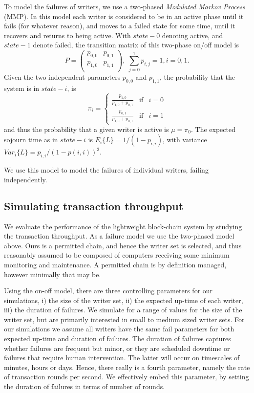 \documentclass[10pt]{article}
\begin{document}
To model the failures of writers, we use a two-phased \emph{Modulated Markov Process} (MMP). In this model each writer is considered to be in an active phase until it fails (for whatever reason), and moves to a failed state for some time, until it recovers and returns to being active. With $state-0$ denoting active, and $state-1$ denote failed, the transition matrix of this two-phase on/off model is
\[
P = 
\begin{pmatrix}
    p_{0,0} & p_{0,1} \\
    p_{1,0} & p_{1,1} \\
\end{pmatrix}
 , \;
\sum_{j=0}^{1} p_{i,j} = 1, i = 0,1.
\]
Given the two independent parameters $p_{0,0}$ and $p_{1,1}$, the probability that the system is in $state-i$, is 
\[
\pi_i = \left\{
\begin{matrix} 
\frac{p_{1,0}}{p_{1,0}+p_{0,1}} & \text{if} & i=0\\
\frac{p_{0,1}}{p_{1,0}+p_{0,1}} & \text{if} & i=1
\end{matrix}
\right.
\]
and thus the probability that a given writer is active is $\mu = \pi_0$. The expected sojourn time as in $state-i$ is $E_i\{L\} = 1/(1-p_{i,i})$, with variance $Var_i\{L\} = p_{i,i}/(1-p(i,i))^2.$

We use this model to model the failures of individual writers, failing independently.

\subsection{Simulating transaction throughput}
We evaluate the performance of the lightweight block-chain system by studying the transaction throughput. As a failure model we use the two-phased model above. Ours is a permitted chain, and hence the writer set is selected, and thus reasonably assumed to be composed of computers receiving some minimum monitoring and maintenance. A permitted chain is by definition managed, however minimally that may be. %

Using the on-off model, there are three controlling parameters for our simulations, i) the size of the writer set, ii) the expected up-time of each writer, iii) the duration of failures. We simulate for a range of values for the size of the writer set, but are primarily interested in small to medium sized writer sets. For our simulations we assume all writers have the same fail parameters for both expected up-time and duration of failures. The duration of failures captures whether failures are frequent but minor, or they are scheduled downtime or failures that require human intervention. The latter will occur on timescales of minutes, hours or days. Hence, there really is a fourth parameter, namely the rate of transaction rounds per second. We effectively embed this parameter, by setting the duration of failures in terms of number of rounds.
\end{document}
